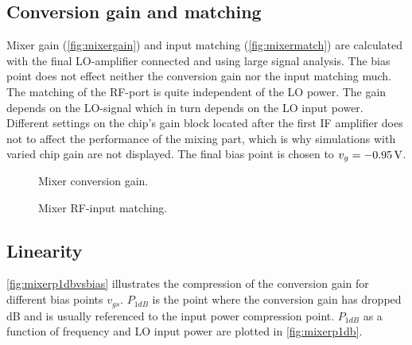 		\subsection{Conversion gain and matching}
			Mixer gain (\autoref{fig:mixergain}) and input matching (\autoref{fig:mixermatch}) are calculated with the final LO-amplifier connected and using large signal analysis. The bias point does not effect neither the conversion gain nor the input matching much. The matching of the RF-port is quite independent of the LO power. The gain depends on the LO-signal which in turn depends on the LO input power. Different settings on the chip's gain block located after the first IF amplifier does not to affect the performance of the mixing part, which is why simulations with varied chip gain are not displayed. The final bias point is chosen to $v_g=\unit[-0.95]{V}$.

			\begin{figure}[hbt!]
				\centering
				\caption[Mixer conversion gain.]{Mixer conversion gain.}\label{fig:mixergain}
			\end{figure}

			\begin{figure}[hbt!]
				\centering
				\caption[Mixer RF-input matching.]{Mixer RF-input matching.}\label{fig:mixermatch}
			\end{figure}

		\subsection{Linearity}
			\autoref{fig:mixerp1dbvsbias} illustrates the compression of the conversion gain for different bias points $v_{gs}$. $P_{1dB}$ is the point where the conversion gain has dropped \unit[1]{dB} and is usually referenced to the input power compression point. $P_{1dB}$ as a function of frequency and LO input power are plotted in \autoref{fig:mixerp1db}.


